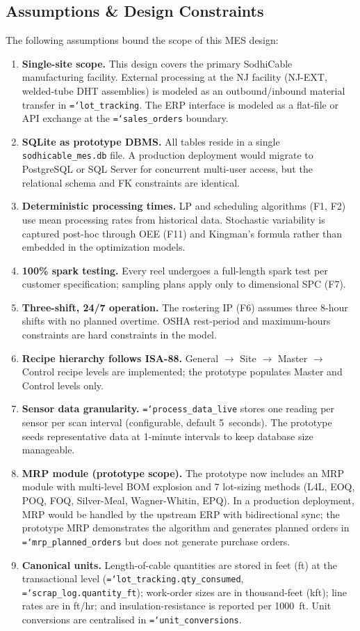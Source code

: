\documentclass[11pt]{article}
\newcommand{\tfield}[1]{\texttt{\hyphenchar\font=`\-\relax #1}}
\begin{document}
\subsection{Assumptions \& Design Constraints}

The following assumptions bound the scope of this MES design:

\begin{enumerate}[leftmargin=1.8em, itemsep=2pt]
\item \textbf{Single-site scope.}  This design covers the primary SodhiCable manufacturing facility.  External processing at the NJ facility (NJ-EXT, welded-tube DHT assemblies) is modeled as an outbound/inbound material transfer in \tfield{lot\_tracking}.  The ERP interface is modeled as a flat-file or API exchange at the \tfield{sales\_orders} boundary.
\item \textbf{SQLite as prototype DBMS.}  All tables reside in a single \texttt{sodhicable\_mes.db} file.  A production deployment would migrate to PostgreSQL or SQL Server for concurrent multi-user access, but the relational schema and FK constraints are identical.
\item \textbf{Deterministic processing times.}  LP and scheduling algorithms (F1, F2) use mean processing rates from historical data.  Stochastic variability is captured post-hoc through OEE (F11) and Kingman's formula rather than embedded in the optimization models.
\item \textbf{100\% spark testing.}  Every reel undergoes a full-length spark test per customer specification; sampling plans apply only to dimensional SPC (F7).
\item \textbf{Three-shift, 24/7 operation.}  The rostering IP (F6) assumes three 8-hour shifts with no planned overtime.  OSHA rest-period and maximum-hours constraints are hard constraints in the model.
\item \textbf{Recipe hierarchy follows ISA-88.}  General $\to$ Site $\to$ Master $\to$ Control recipe levels are implemented; the prototype populates Master and Control levels only.
\item \textbf{Sensor data granularity.}  \tfield{process\_data\_live} stores one reading per sensor per scan interval (configurable, default 5~seconds).  The prototype seeds representative data at 1-minute intervals to keep database size manageable.
\item \textbf{MRP module (prototype scope).}  The prototype now includes an MRP module with multi-level BOM explosion and 7 lot-sizing methods (L4L, EOQ, POQ, FOQ, Silver-Meal, Wagner-Whitin, EPQ).  In a production deployment, MRP would be handled by the upstream ERP with bidirectional sync; the prototype MRP demonstrates the algorithm and generates planned orders in \tfield{mrp\_planned\_orders} but does not generate purchase orders.
\item \textbf{Canonical units.}  Length-of-cable quantities are stored in feet (ft) at the transactional level (\tfield{lot\_tracking.qty\_consumed}, \tfield{scrap\_log.quantity\_ft}); work-order sizes are in thousand-feet (kft); line rates are in ft/hr; and insulation-resistance is reported per 1000~ft.  Unit conversions are centralised in \tfield{unit\_conversions}.
\end{enumerate}
\end{document}

